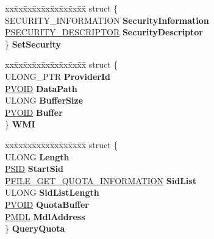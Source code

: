 \begin{DoxyCompactItemize}
\begin{tabbing}
\end{tabbing}\item 
\mbox{\label{union___f_l_t___p_a_r_a_m_e_t_e_r_s_a64cceadb029137ac7e649f281894516d}} 
\begin{tabbing}
xx\=xx\=xx\=xx\=xx\=xx\=xx\=xx\=xx\=\kill
struct \{\\
\>SECURITY\_INFORMATION {\bfseries SecurityInformation}\\
\>\hyperlink{struct___s_e_c_u_r_i_t_y___d_e_s_c_r_i_p_t_o_r}{PSECURITY\_DESCRIPTOR} {\bfseries SecurityDescriptor}\\
\} {\bfseries SetSecurity}\\

\end{tabbing}\item 
\mbox{\label{union___f_l_t___p_a_r_a_m_e_t_e_r_s_aa045643ff9690a586f971033c63aebb4}} 
\begin{tabbing}
xx\=xx\=xx\=xx\=xx\=xx\=xx\=xx\=xx\=\kill
struct \{\\
\>ULONG\_PTR {\bfseries ProviderId}\\
\>\hyperlink{interfacevoid}{PVOID} {\bfseries DataPath}\\
\>ULONG {\bfseries BufferSize}\\
\>\hyperlink{interfacevoid}{PVOID} {\bfseries Buffer}\\
\} {\bfseries WMI}\\

\end{tabbing}\item 
\mbox{\label{union___f_l_t___p_a_r_a_m_e_t_e_r_s_afd826b8180cf2192b8a15c51a827e1a1}} 
\begin{tabbing}
xx\=xx\=xx\=xx\=xx\=xx\=xx\=xx\=xx\=\kill
struct \{\\
\>ULONG {\bfseries Length}\\
\>\hyperlink{struct___s_i_d}{PSID} {\bfseries StartSid}\\
\>\hyperlink{struct___f_i_l_e___g_e_t___q_u_o_t_a___i_n_f_o_r_m_a_t_i_o_n}{PFILE\_GET\_QUOTA\_INFORMATION} {\bfseries SidList}\\
\>ULONG {\bfseries SidListLength}\\
\>\hyperlink{interfacevoid}{PVOID} {\bfseries QuotaBuffer}\\
\>\hyperlink{interfacevoid}{PMDL} {\bfseries MdlAddress}\\
\} {\bfseries QueryQuota}\\


\end{tabbing}
\end{DoxyCompactItemize}
